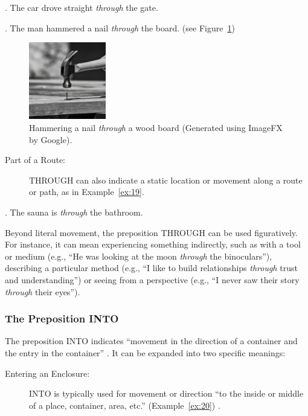 {{    \ex. The car drove straight \emph{through} the gate. \label{ex:17}

    \ex. The man hammered a nail \emph{through} the board. (see Figure~\ref{fig:through}) \label{ex:18}
    
    \begin{figure}[ht]
    \centering
    \includegraphics[width=0.3\textwidth]{textual/Figuras/image_fx_hammering_a_nail_through_a_wooden_board_black.jpg}
    \caption{Hammering a nail \emph{through} a wood board (Generated using ImageFX by Google).} \label{fig:through}
    \end{figure}
    
\begin{description}
    \item[Part of a Route:] THROUGH can also indicate a static location or movement along a route or path, as in Example~\ref{ex:19}.
\end{description}
     
    \ex. The sauna is \emph{through} the bathroom. \label{ex:19}


Beyond literal movement, the preposition THROUGH can be used figuratively. For instance, it can mean experiencing something indirectly, such as with a tool or medium (e.g., ``He was looking at the moon \emph{through} the binoculars''), describing a particular method (e.g., ``I like to build relationships \emph{through} trust and understanding'') or seeing from a perspective (e.g., ``I never saw their story \emph{through} their eyes'').


\subsubsection{The Preposition INTO}

The preposition INTO indicates ``movement in the direction of a container and the entry in the container'' \parencite{bruckfield2011prepositions}. It can be expanded into two specific meanings:

\begin{description}
    \item[Entering an Enclosure:] INTO is typically used for movement or direction ``to the inside or middle of a place, container, area, etc.'' (Example~\ref{ex:20}) \parencite{cambridge-into}.
\end{description}
    
}}
